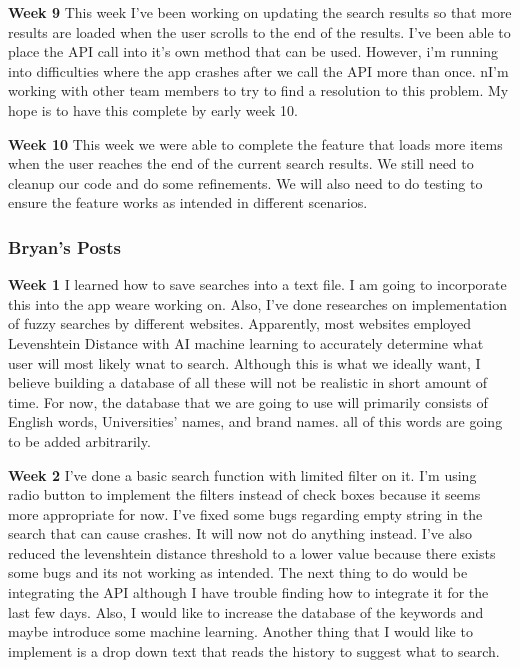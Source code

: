 \documentclass[journal,compsoc, 10pt, draftclsnofoot, onecolumn]{IEEEtran}
\begin{document}
\textbf{Week 9}\newline
This week I've been working on updating the search results so that more results are loaded when 
the user scrolls to the end of the results. I've been able to place the API call into it's own
method that can be used. However, i'm running into difficulties where the app crashes after we
call the API more than once. nI'm working with other team members to try to find a resolution
to this problem. My hope is to have this complete by early week 10.\newline

\textbf{Week 10}\newline
This week we were able to complete the feature that loads more items when the user reaches the
end of the current search results. We still need to cleanup our code and do some refinements.
We will also need to do testing to ensure the feature works as intended in different
scenarios.\newline

\subsubsection*{Bryan's Posts}
\textbf{Week 1}\newline
I learned how to save searches into a text file. I am going to incorporate this into the app
weare working on. Also, I've done researches on implementation of fuzzy searches by different
websites. Apparently, most websites employed Levenshtein Distance with AI machine learning to
accurately determine what user will most likely wnat to search. Although this is what we
ideally want, I believe building a database of all these will not be realistic in short amount
of time. For now, the database that we are going to use will primarily consists of English
words, Universities' names, and brand names. all of this words are going to be added
arbitrarily.
\newline

\textbf{Week 2}\newline
I've done a basic search function with limited filter on it. I'm using radio button to
implement the filters instead of check boxes because it seems more appropriate for now. I've
fixed some bugs regarding empty string in the search that can cause crashes. It will now not do 
anything instead. I've also reduced the levenshtein distance threshold to a lower value because  
there exists some bugs and its not working as intended. The next thing to do would be
integrating the API although I have trouble finding how to integrate it for the last few days.
Also, I would like to increase the database of the keywords and maybe introduce some machine
learning. Another thing that I would like to implement is a drop down text that reads the
history to suggest what to search.\newline
\end{document}
